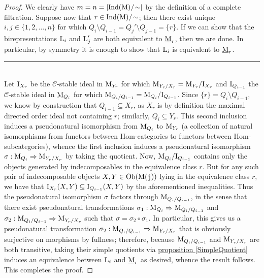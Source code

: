 \noindent\begin{proof} We clearly have $m = n = \lvert\textnormal{Ind}(\textnormal{M})/\!\sim\rvert$ by the definition of a complete filtration. Suppose now that $r \in \textnormal{Ind}(\textnormal{M})/\!\sim$; then there exist unique $i, j \in \{1, 2, \dots, n\}$ for which $Q_i\setminus Q_{i-1} = Q_j'\setminus Q_{j-1} = \{r\}$. If we can show that the birepresentations $\textnormal{L}_i$ and $\textnormal{L}_j'$ are both equivalent to $\underline{\textnormal{M}}_r$, then we are done. In particular, by symmetry it is enough to show that $\textnormal{L}_i$ is equivalent to $\underline{\textnormal{M}}_r$.\\[-1.5\baselineskip]
\begin{center}
\rule{0.5\linewidth}{1pt}
\end{center}
\noindent\\[-\baselineskip]
\noindent Let $\textnormal{I}_{X_r}$ be the $\mathscr{C}$-stable ideal in $\textnormal{M}_{Y_r}$ for which $\textnormal{M}_{Y_r/X_r} = \textnormal{M}_{Y_r}/\textnormal{I}_{X_r}$ and $\textnormal{I}_{Q_{i-1}}$ the $\mathscr{C}$-stable ideal in $\textnormal{M}_{Q_i}$ for which $\textnormal{M}_{Q_i/Q_{i-1}} = \textnormal{M}_{Q_i}/\textnormal{I}_{Q_{i-1}}$. Since $\{r\} = Q_i\setminus Q_{i-1}$, we know by construction that $Q_{i-1} \subseteq X_r$, as $X_r$ is by definition the maximal directed order ideal not containing $r$; similarly, $Q_i \subseteq Y_r$. This second inclusion induces a pseudonatural isomorphism from $\textnormal{M}_{Q_i}$ to $\textnormal{M}_{Y_r}$ (a collection of natural isomorphisms from functors between Hom-categories to functors between Hom-subcategories), whence the first inclusion induces a pseudonatural isomorphism $\sigma : \textnormal{M}_{Q_i} \Rightarrow \textnormal{M}_{Y_r/X_r}$ by taking the quotient. Now, $\textnormal{M}_{Q_i}/\textnormal{I}_{Q_{i-1}}$ contains only the objects generated by indecomposables in the equivalence class $r$. But for any such pair of indecomposable objects $X, Y \in \textnormal{Ob}(\textnormal{M}(\textnormal{\texttt{j}}))$ lying in the equivalence class $r$, we have that $\textnormal{I}_{X_r}(X, Y) \subseteq \textnormal{I}_{Q_{i-1}}(X, Y)$ by the aforementioned inequalities. Thus the pseudonatural isomorphism $\sigma$ factors through $\textnormal{M}_{Q_i/Q_{i-1}}$, in the sense that there exist pseudonatural transformations $\sigma_1 : \textnormal{M}_{Q_i} \Rightarrow \textnormal{M}_{Q_i/Q_{i-1}}$ and $\sigma_2 : \textnormal{M}_{Q_i/Q_{i-1}} \Rightarrow \textnormal{M}_{Y_r/X_r}$ such that $\sigma = \sigma_2 \circ \sigma_1$. In particular, this gives us a pseudonatural transformation $\sigma_2 : \textnormal{M}_{Q_i/Q_{i-1}} \Rightarrow \textnormal{M}_{Y_r/X_r}$ that is obviously surjective on morphisms by fullness; therefore, because $\textnormal{M}_{Q_i/Q_{i-1}}$ and $\textnormal{M}_{Y_r/X_r}$ are both transitive, taking their simple quotients via \hyperref[SimpleQuotient]{proposition \ref*{SimpleQuotient}} induces an equivalence between $\textnormal{L}_i$ and $\underline{\textnormal{M}}_r$ as desired, whence the result follows. This completes the proof.
\end{proof}\\

